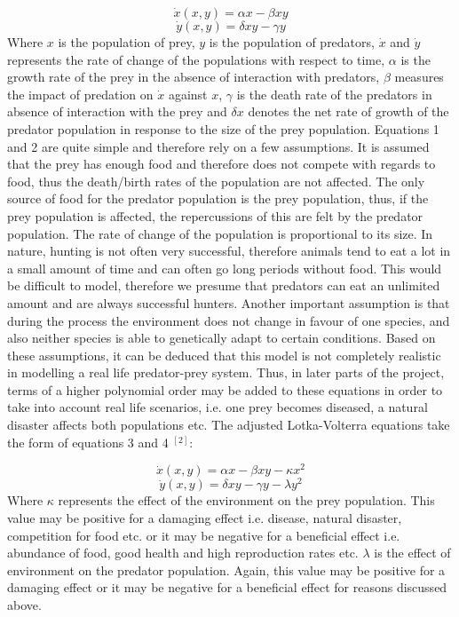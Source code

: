 \documentclass[11pt]{elsarticle}
\begin{document}
\begin{equation}
\dot{x}\left ( x,y \right )=\alpha x - \beta xy
\end{equation}
\begin{equation}
\dot{y}\left ( x,y \right )=\delta xy - \gamma y
\end{equation}
Where $x$ is the population of prey, $y$ is the population of predators, $\dot{x}$ and $\dot{y}$ represents the rate of change of the populations with respect to time, $\alpha$ is the growth rate of the prey in the absence of interaction with predators, $\beta$ measures the impact of predation on $\dot{x}$ against $x$, $\gamma$ is the death rate of the predators in absence of interaction with the prey and $\delta x$ denotes the net rate of growth of the predator population in response to the size of the prey population. Equations 1 and 2 are quite simple and therefore rely on a few assumptions. It is assumed that the prey has enough food and therefore does not compete with regards to food, thus the death/birth rates of the population are not affected. The only source of food for the predator population is the prey population, thus, if the prey population is affected, the repercussions of this are felt by the predator population. The rate of change of the population is proportional to its size. In nature, hunting is not often very successful, therefore animals tend to eat a lot in a small amount of time and can often go long periods without food. This would be difficult to model, therefore we presume that predators can eat an unlimited amount and are always successful hunters. Another important assumption is that during the process the environment does not change in favour of one species, and also neither species is able to genetically adapt to certain conditions. Based on these assumptions, it can be deduced that this model is not completely realistic in modelling a real life predator-prey system. Thus, in later parts of the project, terms of a higher polynomial order may be added to these equations in order to take into account real life scenarios, i.e. one prey becomes diseased, a natural disaster affects both populations etc. The adjusted Lotka-Volterra equations take the form of equations 3 and 4 $^{[2]}$:

\begin{equation}
\dot{x}\left ( x,y \right )=\alpha x - \beta xy - \kappa x^2
\end{equation}
\begin{equation}
\dot{y}\left ( x,y \right )=\delta xy - \gamma y - \lambda y^2
\end{equation}
Where $\kappa$ represents the effect of the environment on the prey population. This value may be positive for a damaging effect i.e. disease, natural disaster, competition for food etc. or it may be negative for a beneficial effect i.e. abundance of food, good health and high reproduction rates etc. $\lambda$ is the effect of environment on the predator population. Again, this value may be positive for a damaging effect or it may be negative for a beneficial effect for reasons discussed above.
\end{document}
